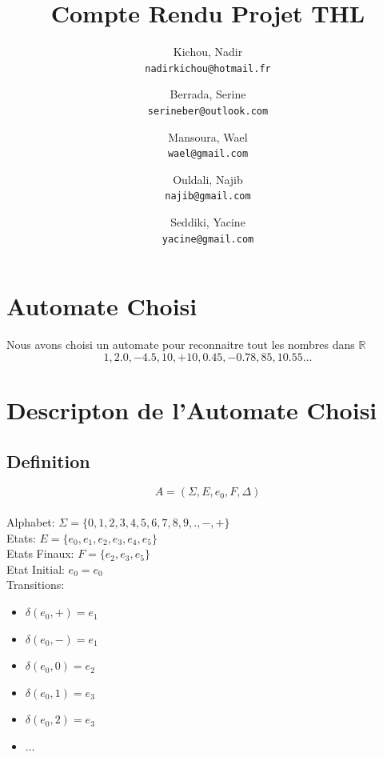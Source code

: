\documentclass{article}
\title{Compte Rendu Projet THL}
\author{
  Kichou, Nadir\\
  \texttt{nadirkichou@hotmail.fr}
  \and
  Berrada, Serine\\
  \texttt{serineber@outlook.com}
   \and
  Mansoura, Wael\\
  \texttt{wael@gmail.com}
   \and
  Ouldali, Najib\\
  \texttt{najib@gmail.com}
  \and
  Seddiki, Yacine\\
  \texttt{yacine@gmail.com}
}
\begin{document}
\maketitle

\pagebreak

\setcounter{tocdepth}{1} %

\tableofcontents

\pagebreak

\section{Automate Choisi}

Nous avons choisi un automate pour reconnaitre tout les nombres dans $\mathbb{R}$ $$1, 2.0, -4.5, 10, +10, 0.45, -0.78, 85, 10.55 \ldots$$

\section{Descripton de l'Automate Choisi}

\subsection{Definition}

$$A = (\Sigma, E, e_0, F, \Delta)$$\\
Alphabet: $\Sigma = \{0, 1, 2, 3, 4, 5, 6, 7, 8, 9, ., -, +\}$\\
Etats: $E = \{e_0, e_1, e_2, e_3, e_4, e_5\}$\\
Etats Finaux: $F = \{e_2, e_3, e_5\}$\\
Etat Initial: $e_0 = e_0$\\
Transitions:
\begin{multicols}{2}
\begin{itemize}
  \item \tab $\delta(e_0, +) = e_1$
  \item \tab $\delta(e_0, -) = e_1$
  \item \tab $\delta(e_0, 0) = e_2$
  \item \tab $\delta(e_0, 1) = e_3$
  \item \tab $\delta(e_0, 2) = e_3$
  \item \tab $\ldots$
\end{itemize}
\end{multicols}
\end{document}
